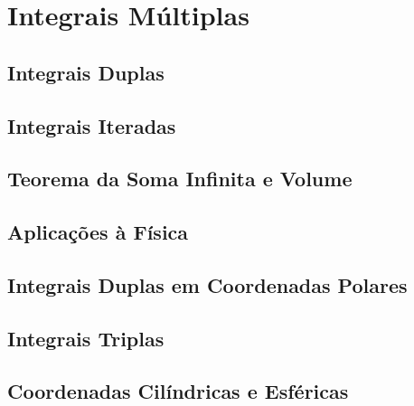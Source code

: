 \chapter{Integrais Múltiplas}
\label{chp:multipleint}

\section{Integrais Duplas}
\label{sec:doubleintegrals}

\section{Integrais Iteradas}
\label{sec:iteratedintegrals}

\section{Teorema da Soma Infinita e Volume}
\label{sec:infinitesum}

\section{Aplicações à Física}
\label{sec:applphysics}

\section{Integrais Duplas em Coordenadas Polares}
\label{sec:doubleintpolar}

\section{Integrais Triplas}
\label{sec:tripleint}

\section{Coordenadas Cilíndricas e Esféricas}
\label{sec:cylsphcoord}

\begin{chapterproblems}
\end{chapterproblems}
